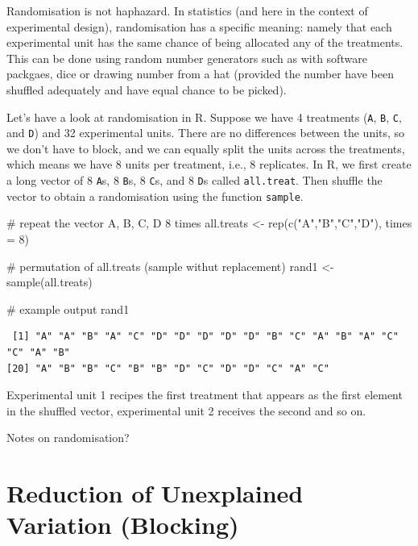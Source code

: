 \documentclass[
  letterpaper,
  DIV=11,
  numbers=noendperiod,
  oneside]{scrreprt}
\newenvironment{Shaded}{\begin{snugshade}}{\end{snugshade}}
\newcommand{\AttributeTok}[1]{\textcolor[rgb]{0.40,0.45,0.13}{#1}}
\newcommand{\CommentTok}[1]{\textcolor[rgb]{0.37,0.37,0.37}{#1}}
\newcommand{\DecValTok}[1]{\textcolor[rgb]{0.68,0.00,0.00}{#1}}
\newcommand{\FunctionTok}[1]{\textcolor[rgb]{0.28,0.35,0.67}{#1}}
\newcommand{\NormalTok}[1]{\textcolor[rgb]{0.00,0.23,0.31}{#1}}
\newcommand{\OtherTok}[1]{\textcolor[rgb]{0.00,0.23,0.31}{#1}}
\newcommand{\StringTok}[1]{\textcolor[rgb]{0.13,0.47,0.30}{#1}}
\begin{document}
Randomisation is not haphazard. In statistics (and here in the context
of experimental design), randomisation has a specific meaning: namely
that each experimental unit has the same chance of being allocated any
of the treatments. This can be done using random number generators such
as with software packgaes, dice or drawing number from a hat (provided
the number have been shuffled adequately and have equal chance to be
picked).

Let's have a look at randomisation in R. Suppose we have 4 treatments
(\texttt{A}, \texttt{B}, \texttt{C}, and \texttt{D}) and 32 experimental
units. There are no differences between the units, so we don't have to
block, and we can equally split the units across the treatments, which
means we have 8 units per treatment, i.e., 8 replicates. In R, we first
create a long vector of 8 \texttt{A}s, 8 \texttt{B}s, 8 \texttt{C}s, and
8 \texttt{D}s called \texttt{all.treat}. Then shuffle the vector to
obtain a randomisation using the function \texttt{sample}.

\begin{Shaded}
\begin{Highlighting}[]
\CommentTok{\# repeat the vector A, B, C, D 8 times }
\NormalTok{all.treats }\OtherTok{\textless{}{-}} \FunctionTok{rep}\NormalTok{(}\FunctionTok{c}\NormalTok{(}\StringTok{"A"}\NormalTok{,}\StringTok{"B"}\NormalTok{,}\StringTok{"C"}\NormalTok{,}\StringTok{"D"}\NormalTok{), }\AttributeTok{times =} \DecValTok{8}\NormalTok{)}

\CommentTok{\# permutation of all.treats (sample withut replacement)}
\NormalTok{rand1 }\OtherTok{\textless{}{-}} \FunctionTok{sample}\NormalTok{(all.treats)}

\CommentTok{\# example output}
\NormalTok{rand1}
\end{Highlighting}
\end{Shaded}

\begin{verbatim}
 [1] "A" "A" "B" "A" "C" "D" "D" "D" "D" "D" "B" "C" "A" "B" "A" "C" "C" "A" "B"
[20] "A" "B" "B" "C" "B" "B" "D" "C" "D" "D" "C" "A" "C"
\end{verbatim}

Experimental unit 1 recipes the first treatment that appears as the
first element in the shuffled vector, experimental unit 2 receives the
second and so on.

Notes on randomisation?

\section{Reduction of Unexplained Variation
(Blocking)}\label{reduction-of-unexplained-variation-blocking}
\end{document}
